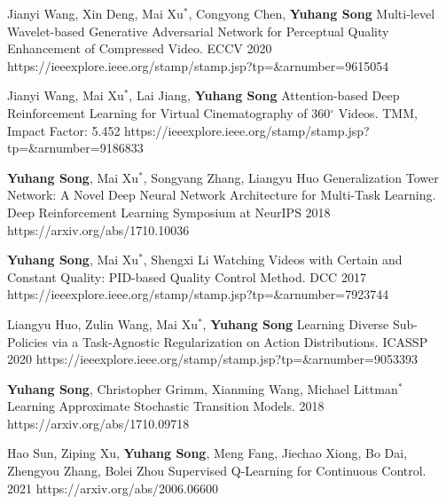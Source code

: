     \Conference
    {Jianyi Wang, 
    Xin Deng, 
    Mai Xu$^*$, 
    Congyong Chen, 
    \textbf{Yuhang Song}}
    {Multi-level Wavelet-based Generative Adversarial Network for Perceptual Quality Enhancement of Compressed Video.}
    {ECCV 2020}
    {https://ieeexplore.ieee.org/stamp/stamp.jsp?tp=&arnumber=9615054}
    
    \Journal
    {Jianyi Wang, 
    Mai Xu$^*$, 
    Lai Jiang, 
    \textbf{Yuhang Song}}
    {Attention-based Deep Reinforcement Learning for Virtual Cinematography of 360$^{\circ}$ Videos.}
    {TMM, Impact Factor: 5.452}
    {https://ieeexplore.ieee.org/stamp/stamp.jsp?tp=&arnumber=9186833}

    \Workshop
    {\textbf{Yuhang Song}, 
    Mai Xu$^*$, 
    Songyang Zhang,
    Liangyu Huo}
    {Generalization Tower Network: A Novel Deep Neural Network Architecture for Multi-Task Learning.}
    {Deep Reinforcement Learning Symposium at NeurIPS 2018}
    {https://arxiv.org/abs/1710.10036}
        
    \Conference
    {\textbf{Yuhang Song}, 
    Mai Xu$^*$, 
    Shengxi Li}
    {Watching Videos with Certain and Constant Quality: PID-based Quality Control Method.}
    {DCC 2017}
    {https://ieeexplore.ieee.org/stamp/stamp.jsp?tp=&arnumber=7923744}
    
    \Journal
    {Liangyu Huo, 
    Zulin Wang, 
    Mai Xu$^*$, 
    \textbf{Yuhang Song}}
    {Learning Diverse Sub-Policies via a Task-Agnostic Regularization on Action Distributions.}
    {ICASSP 2020}
    {https://ieeexplore.ieee.org/stamp/stamp.jsp?tp=&arnumber=9053393}

    \TechnicalReport
    {\textbf{Yuhang Song}, 
    Christopher Grimm, 
    Xianming Wang, 
    Michael Littman$^*$}
    {Learning Approximate Stochastic Transition Models.}
    {2018}
    {https://arxiv.org/abs/1710.09718}
        
    \TechnicalReport
    {Hao Sun, 
    Ziping Xu, 
    \textbf{Yuhang Song}, 
    Meng Fang, 
    Jiechao Xiong, 
    Bo Dai, 
    Zhengyou Zhang, 
    Bolei Zhou}
    {Supervised Q-Learning for Continuous Control.}
    {2021}
    {https://arxiv.org/abs/2006.06600}
        
